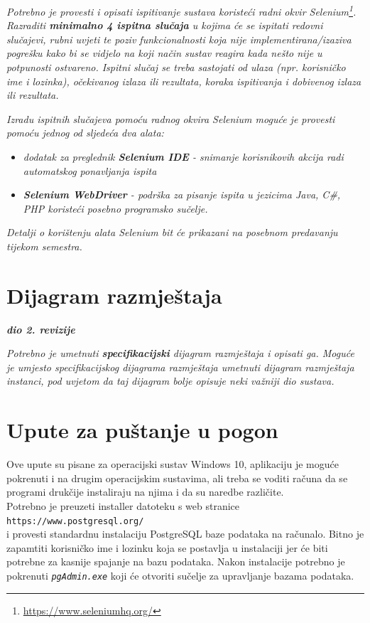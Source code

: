 			 \textit{Potrebno je provesti i opisati ispitivanje sustava koristeći radni okvir Selenium\footnote{\url{https://www.seleniumhq.org/}}. Razraditi \textbf{minimalno 4 ispitna slučaja} u kojima će se ispitati redovni slučajevi, rubni uvjeti te poziv funkcionalnosti koja nije implementirana/izaziva pogrešku kako bi se vidjelo na koji način sustav reagira kada nešto nije u potpunosti ostvareno. Ispitni slučaj se treba sastojati od ulaza (npr. korisničko ime i lozinka), očekivanog izlaza ili rezultata, koraka ispitivanja i dobivenog izlaza ili rezultata.\\ }
			 
			 \textit{Izradu ispitnih slučajeva pomoću radnog okvira Selenium moguće je provesti pomoću jednog od sljedeća dva alata:}
			 \begin{itemize}
			 	\item \textit{dodatak za preglednik \textbf{Selenium IDE} - snimanje korisnikovih akcija radi automatskog ponavljanja ispita	}
			 	\item \textit{\textbf{Selenium WebDriver} - podrška za pisanje ispita u jezicima Java, C\#, PHP koristeći posebno programsko sučelje.}
			 \end{itemize}
		 	\textit{Detalji o korištenju alata Selenium bit će prikazani na posebnom predavanju tijekom semestra.}
			
			\eject 
		
		
		\section{Dijagram razmještaja}
			
			\textbf{\textit{dio 2. revizije}}
			
			 \textit{Potrebno je umetnuti \textbf{specifikacijski} dijagram razmještaja i opisati ga. Moguće je umjesto specifikacijskog dijagrama razmještaja umetnuti dijagram razmještaja instanci, pod uvjetom da taj dijagram bolje opisuje neki važniji dio sustava.}
			
			\eject 
		
		\section{Upute za puštanje u pogon}
		
			Ove upute su pisane za operacijski sustav Windows 10, aplikaciju je moguće pokrenuti i na drugim operacijskim sustavima, ali treba se voditi računa da se programi drukčije instaliraju na njima i da su naredbe različite.
			\\
			Potrebno je preuzeti installer datoteku s web stranice
			\\ 
			\texttt{\small https://www.postgresql.org/}
			\\
			i provesti standardnu instalaciju PostgreSQL baze podataka na računalo. Bitno je zapamtiti korisničko ime i lozinku koja se postavlja u instalaciji jer će biti potrebne za kasnije spajanje na bazu podataka. Nakon instalacije potrebno je pokrenuti \texttt{\textit{pgAdmin.exe}} koji će otvoriti sučelje za upravljanje bazama podataka.
			
